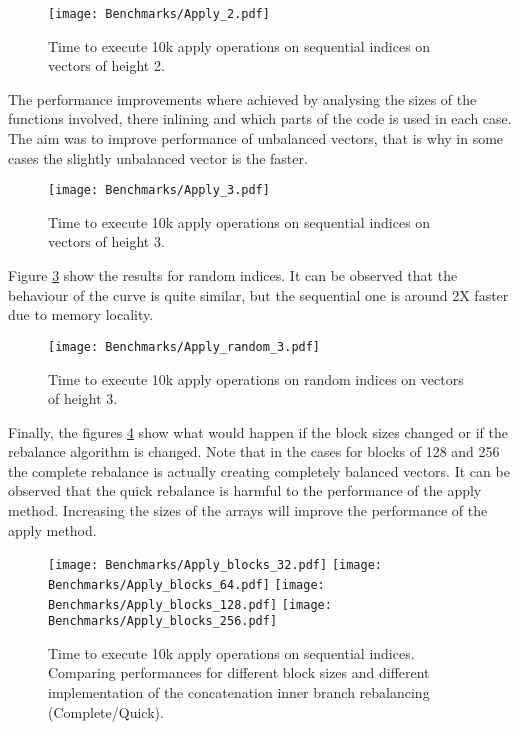\begin{figure}[h!]
  \centering
  \texttt{[image: Benchmarks/Apply\_2.pdf]}
  \caption{Time to execute 10k apply operations on sequential indices on vectors of height 2.}
   \label{ApplyBenchmarks2}
\end{figure}

The performance improvements where achieved by analysing the sizes of the functions involved, there inlining and which parts of the code is used in each case. The aim was to improve performance of unbalanced vectors, that is why in some cases the slightly unbalanced vector is the faster. 

\begin{figure}[h!]
  \centering
  \texttt{[image: Benchmarks/Apply\_3.pdf]}
  \caption{Time to execute 10k apply operations on sequential indices on vectors of height 3.}
   \label{ApplyBenchmarks3}
\end{figure}

\FloatBarrier

Figure \ref{ApplyRandomBenchmarks} show the results for random indices. It can be observed that the behaviour of the curve is quite similar, but the sequential one is around 2X faster due to memory locality.

\begin{figure}[h!]
  \centering
  \texttt{[image: Benchmarks/Apply\_random\_3.pdf]}
  \caption{Time to execute 10k apply operations on random indices on vectors of height 3.}
  \label{ApplyRandomBenchmarks}
\end{figure}

\FloatBarrier

Finally, the figures \ref{ApplyBlocksBenchmarks} show what would happen if the block sizes changed or if the rebalance algorithm is changed. Note that in the cases for blocks of 128 and 256 the complete rebalance is actually creating completely balanced vectors. It can be observed that the quick rebalance is harmful to the performance of the apply method. Increasing the sizes of the arrays will improve the performance of the apply method.

\begin{figure}[h!]
  \centering
  \texttt{[image: Benchmarks/Apply\_blocks\_32.pdf]}
  \texttt{[image: Benchmarks/Apply\_blocks\_64.pdf]}
  \texttt{[image: Benchmarks/Apply\_blocks\_128.pdf]}
  \texttt{[image: Benchmarks/Apply\_blocks\_256.pdf]}
   \caption{Time to execute 10k apply operations on sequential indices. Comparing performances for different block sizes and different implementation of the concatenation inner branch rebalancing (Complete/Quick).}
  \label{ApplyBlocksBenchmarks}
\end{figure}

